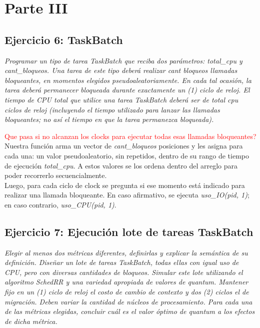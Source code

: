 \documentclass[a4paper]{article}
\begin{document}
\newpage
\section{Parte III}


 \subsection{Ejercicio 6: TaskBatch}
\textit{Programar un tipo de tarea TaskBatch que reciba dos par\'ametros: total_cpu y cant_bloqueos. Una tarea de este tipo deber\'a realizar cant bloqueos llamadas bloqueantes, en momentos elegidos pseudoaleatoriamente. En cada tal ocasi\'on, la tarea deber\'a permanecer bloqueada durante exactamente un (1) ciclo de reloj. El tiempo de CPU total que utilice una tarea TaskBatch deber\'a ser de total cpu ciclos de reloj (incluyendo el tiempo utilizado para lanzar las llamadas bloqueantes; no as\'i el tiempo en que la tarea permanezca bloqueada).}


\textcolor{red}{Que pasa si no alcanzan los clocks para ejecutar todas esas llamadas bloqueantes?}\\

Nuestra funci\'on arma un vector de \emph{cant_bloqueos} posiciones y les asigna para cada una: un valor pseudoaleatorio, sin repetidos, dentro de su rango de tiempo de ejecuci\'on \emph{total_cpu}. A estos valores se los ordena dentro del arreglo para poder recorrerlo secuencialmente.\\

Luego, para cada ciclo de clock se pregunta si ese momento est\'a indicado para realizar una llamada bloqueante. En caso afirmativo, se ejecuta \textit{uso_IO(pid, 1)}; en caso contrario, \textit{uso_CPU(pid, 1)}.

\bigskip 
 \subsection{Ejercicio 7: Ejecuci\'on lote de tareas TaskBatch}
\textit{Elegir al menos dos m\'etricas diferentes, definirlas y explicar la sem\'antica de su definici\'on. Dise\~nar un lote de tareas TaskBatch, todas ellas con igual uso de CPU, pero con diversas cantidades de bloqueos. Simular este lote utilizando el algoritmo SchedRR y una variedad apropiada de valores de quantum. Mantener fijo en un (1) ciclo de reloj el costo de cambio de contexto y dos (2) ciclos el de migraci\'on. Deben variar la cantidad de n\'ucleos de procesamiento. Para cada una de las m\'etricas elegidas, concluir cu\'al es el valor \'optimo de quantum a los efectos de dicha m\'etrica.}\\
\end{document}
